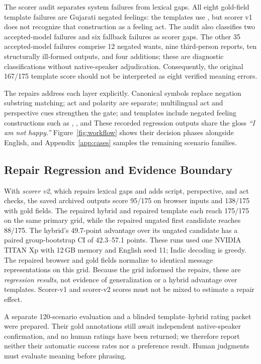 The scorer audit separates system failures from lexical gaps.
All eight gold-field template failures are Gujarati negated feelings: the templates use , but scorer v1 does not recognize that construction as a feeling act.
The audit also classifies two accepted-model failures and six fallback failures as scorer gaps.
The other 35 accepted-model failures comprise 12 negated wants, nine third-person reports, ten structurally ill-formed outputs, and four additions; these are diagnostic classifications without native-speaker adjudication.
Consequently, the original 167/175 template score should not be interpreted as eight verified meaning errors.

The repairs address each layer explicitly.
Canonical symbols replace negation substring matching; act and polarity are separate; multilingual act and perspective cues strengthen the gate; and templates include negated feeling constructions such as  ,  , and  
These recorded regression outputs share the gloss \emph{``I am not happy.''}
Figure~\ref{fig:workflow} shows their decision phases alongside English, and Appendix~\ref{app:cases} samples the remaining scenario families.

\subsection{Repair Regression and Evidence Boundary}
With \emph{scorer v2}, which repairs lexical gaps and adds script, perspective, and act checks, the saved archived outputs score 95/175 on browser inputs and 138/175 with gold fields.
The repaired hybrid and repaired template each reach 175/175 on the same primary grid, while the repaired ungated first candidate reaches 88/175.
The hybrid's 49.7-point advantage over its ungated candidate has a paired group-bootstrap CI of 42.3--57.1 points.
These runs used one NVIDIA TITAN Xp with 12\,GB memory and English seed 11; Indic decoding is greedy.
The repaired browser and gold fields normalize to identical message representations on this grid.
Because the grid informed the repairs, these are \emph{regression results}, not evidence of generalization or a hybrid advantage over templates.
Scorer-v1 and scorer-v2 scores must not be mixed to estimate a repair effect.

A separate 120-scenario evaluation and a blinded template--hybrid rating packet were prepared.
Their gold annotations still await independent native-speaker confirmation, and no human ratings have been returned; we therefore report neither their automatic success rates nor a preference result.
Human judgments must evaluate meaning before phrasing.

